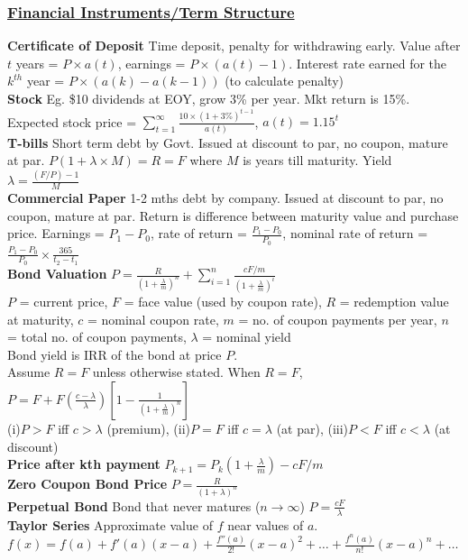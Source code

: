 \documentclass{article}
\begin{document}
{\begin{multicols*}{3}
\subsubsection*{\underline{Financial Instruments/Term Structure}}
\textbf{Certificate of Deposit} Time deposit, penalty for withdrawing early. Value after $t$ years = $P\times a(t)$, earnings = $P\times(a(t)-1)$. Interest rate earned for the $k^{th}$ year = $P\times(a(k)-a(k-1))$ (to calculate penalty)\\
\textbf{Stock} Eg. \$10 dividends at EOY, grow 3\% per year. Mkt return is 15\%. Expected stock price = $\sum_{t=1}^\infty \frac{10\times(1+3\%)^{t-1}}{a(t)}$, $a(t)=1.15^t$\\ 
\textbf{T-bills} Short term debt by Govt. Issued at discount to par, no coupon, mature at par. $P(1+\lambda\times M)=R=F$ where $M$ is years till maturity. Yield $\lambda=\frac{(F/P)-1}{M}$\\
\textbf{Commercial Paper}  1-2 mths debt by company. Issued at discount to par, no coupon, mature at par. Return is difference between maturity value and purchase price. Earnings = $P_1-P_0$, rate of return = $\frac{{P_1-P_0}}{P_0}$, nominal rate of return = $\frac{P_1-P_0}{P_0}\times\frac{365}{t_2-t_1}$ \\
\textbf{Bond Valuation} $P=\frac{R}{(1+\frac{\lambda}{m})^n}+\sum_{i=1}^n\frac{cF/m}{(1+\frac{\lambda}{m})^i}$\\
$P$ = current price, $F$ = face value (used by coupon rate), $R$ = redemption value at maturity, $c$ = nominal coupon rate, $m$ = no. of coupon payments per year, $n$ = total no. of coupon payments, $\lambda$ = nominal yield\\
Bond yield is IRR of the bond at price $P$.\\
Assume $R=F$ unless otherwise stated. When $R=F$, $P=F+F\left(\frac{c-\lambda}{\lambda}\right)\left[1-\frac{1}{(1+\frac{\lambda}{m})^n}\right]$\\
(i)$P>F$ iff $c>\lambda$ (premium), (ii)$P=F$ iff $c=\lambda$ (at par), (iii)$P<F$ iff $c<\lambda$ (at discount)\\
\textbf{Price after kth payment} $P_{k+1}=P_k(1+\frac{\lambda}{m})-cF/m$\\
\textbf{Zero Coupon Bond Price} $P=\frac{R}{(1+\lambda)^n}$\\
\textbf{Perpetual Bond} Bond that never matures ($n\to\infty$) $P=\frac{cF}{\lambda}$\\
\textbf{Taylor Series} Approximate value of $f$ near values of $a$. $f(x)=f(a)+f'(a)(x-a)+\frac{f''(a)}{2!}(x-a)^2+\dots+\frac{f^n(a)}{n!}(x-a)^n+\dots$\\

\end{multicols*}}
\end{document}
